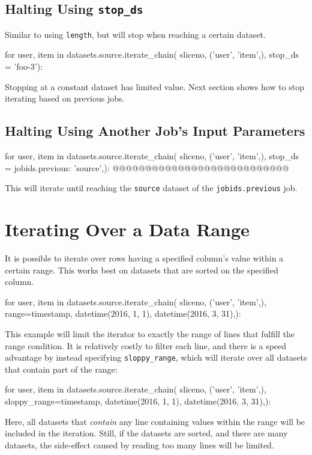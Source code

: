 \subsection{Halting Using \texttt{stop\_ds}}
Similar to using \texttt{length}, but will stop when reaching a
certain dataset.
\begin{python}
for user, item in datasets.source.iterate_chain(
                       sliceno, ('user', 'item',),
                       stop_ds = 'foo-3'):
\end{python}
Stopping at a constant dataset has limited value.  Next section shows
how to stop iterating based on previous jobs.



\subsection{Halting Using Another Job's Input Parameters}
\begin{python}
for user, item in datasets.source.iterate_chain(
                       sliceno, ('user', 'item',),
                       stop_ds = {jobids.previous: 'source',}):
@@@@@@@@@@@@@@@@@@@@@@@@@@@
\end{python}
This will iterate until reaching the \texttt{source} dataset of
the \texttt{jobids.previous} job.



\section{Iterating Over a Data Range}
\label{sec:iterate_sloppy_range}
It is possible to iterate over rows having a specified column's value
within a certain range.  This works best on datasets that are sorted
on the specified column.
\begin{python}
for user, item in datasets.source.iterate_chain(
           sliceno, ('user', 'item',),
           range={timestamp, datetime(2016, 1, 1), datetime(2016, 3, 31),}):
\end{python}
This example will limit the iterator to exactly the range of lines
that fulfill the range condition.  It is relatively costly to filter
each line, and there is a speed advantage by instead specifying
\texttt{sloppy\_range}, which will iterate over all datasets that
contain part of the range:
\begin{python}
for user, item in datasets.source.iterate_chain(
           sliceno, ('user', 'item',),
           sloppy_range={timestamp,
                         datetime(2016, 1, 1),
                         datetime(2016, 3, 31),}):
\end{python}
Here, all datasets that \textsl{contain} any line containing values
within the range will be included in the iteration.  Still, if the
datasets are sorted, and there are many datasets, the side-effect
caused by reading too many lines will be limited.



